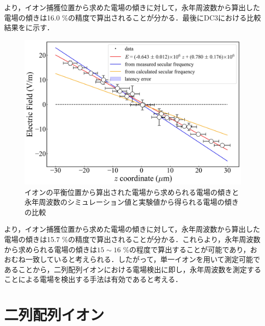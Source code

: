 より，イオン捕獲位置から求めた電場の傾きに対して，永年周波数から算出した電場の傾きは16.0 \%の精度で算出されることが分かる．最後にDC3における比較結果をに示す．

\begin{figure}[h]
	\begin{center}
		\includegraphics[width = 0.6\linewidth]{./results/figure/DC3_COMP.jpg}
		\caption{イオンの平衡位置から算出された電場から求められる電場の傾きと永年周波数のシミュレーション値と実験値から得られる電場の傾きの比較}
		\label{fig:DC3_COMP}
	\end{center}
\end{figure}

より，イオン捕獲位置から求めた電場の傾きに対して，永年周波数から算出した電場の傾きは15.7 \%の精度で算出されることが分かる．これらより，永年周波数から求められる電場の傾きは$15 \sim 16$ \%の程度で算出することが可能であり，おおむね一致していると考えられる．したがって，単一イオンを用いて測定可能であることから，二列配列イオンにおける電場検出に即し，永年周波数を測定することによる電場を検出する手法は有効であると考える．
%
\clearpage
%
\section{二列配列イオン}
